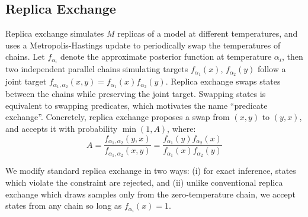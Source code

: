 \subsection{Replica Exchange}\label{replicaexchange}
Replica exchange \citep{swendsen1986replica} simulates $M$ replicas of a model at different temperatures, and uses a Metropolis-Hastings update to  periodically swap the temperatures of chains.
Let $f_{\alpha_i}$ denote the approximate posterior function at temperature $\alpha_i$, then two independent parallel chains simulating targets $f_{\alpha_1}(x)$, $f_{\alpha_2}(y)$  follow a joint target $f_{\alpha_1, \alpha_2}(x,y) = f_{\alpha_1}(x)f_{\alpha_2}(y)$.
Replica exchange swaps states between the chains while preserving the joint target.
Swapping states is equivalent to swapping predicates, which motivates the name ``predicate exchange''.
Concretely, replica exchange proposes a swap from $(x, y)$ to $(y, x)$, and accepts it with probability $\min(1, A)$, where:
\begin{equation}
A =  \frac{f_{\alpha_1, \alpha_2}(y,x)}{f_{\alpha_1, \alpha_2}(x,y)} = \frac{f_{\alpha_1}(y)f_{\alpha_2}(x)}{f_{\alpha_1}(x)f_{\alpha_2}(y)}
\end{equation}

We modify standard replica exchange in two ways: (i) for exact inference, states which violate the constraint are rejected, and (ii)
unlike conventional replica exchange which draws samples only from the zero-temperature chain, we accept states from any chain so long as $f_{\alpha_i}(x) = 1$.







